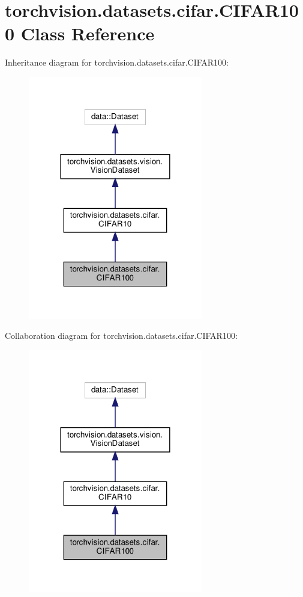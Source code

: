 \hypertarget{classtorchvision_1_1datasets_1_1cifar_1_1CIFAR100}{}\section{torchvision.\+datasets.\+cifar.\+C\+I\+F\+A\+R100 Class Reference}
\label{classtorchvision_1_1datasets_1_1cifar_1_1CIFAR100}


Inheritance diagram for torchvision.\+datasets.\+cifar.\+C\+I\+F\+A\+R100\+:
\nopagebreak
\begin{figure}[H]
\begin{center}
\leavevmode
\includegraphics[width=216pt]{classtorchvision_1_1datasets_1_1cifar_1_1CIFAR100__inherit__graph}
\end{center}
\end{figure}


Collaboration diagram for torchvision.\+datasets.\+cifar.\+C\+I\+F\+A\+R100\+:
\nopagebreak
\begin{figure}[H]
\begin{center}
\leavevmode
\includegraphics[width=216pt]{classtorchvision_1_1datasets_1_1cifar_1_1CIFAR100__coll__graph}
\end{center}
\end{figure}
